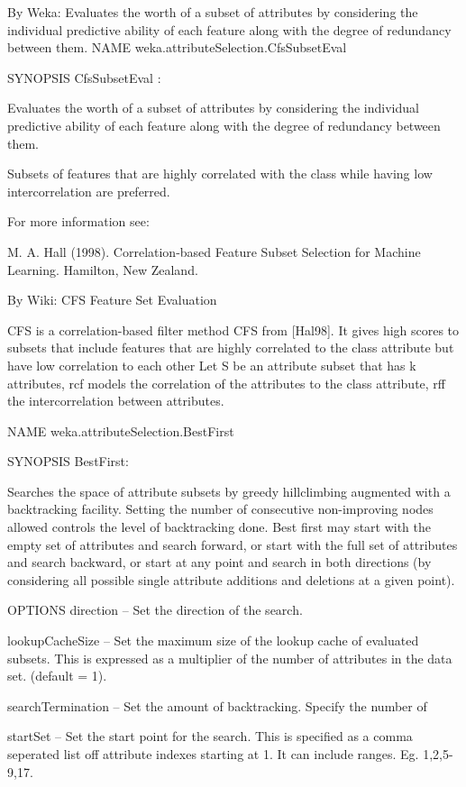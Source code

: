 By Weka:
Evaluates the worth of a subset of attributes by considering the individual predictive ability of each feature along with the degree of redundancy between them.
NAME
weka.attributeSelection.CfsSubsetEval

SYNOPSIS
CfsSubsetEval :

Evaluates the worth of a subset of attributes by considering the individual predictive ability of each feature along with the degree of redundancy between them.

Subsets of features that are highly correlated with the class while having low intercorrelation are preferred.

For more information see:

M. A. Hall (1998). Correlation-based Feature Subset Selection for Machine Learning. Hamilton, New Zealand.



By Wiki:
CFS Feature Set Evaluation

CFS is a correlation-based filter method CFS from [Hal98]. It gives high scores to subsets that include features
that are highly correlated to the class attribute but have low correlation to each other Let S be an attribute
subset that has k attributes, rcf models the correlation of the attributes to the class attribute, rff the
intercorrelation between attributes.


NAME
weka.attributeSelection.BestFirst

SYNOPSIS
BestFirst:

Searches the space of attribute subsets by greedy hillclimbing augmented with a backtracking facility. Setting the number of consecutive non-improving nodes allowed controls the level of backtracking done. Best first may start with the empty set of attributes and search forward, or start with the full set of attributes and search backward, or start at any point and search in both directions (by considering all possible single attribute additions and deletions at a given point).


OPTIONS
direction -- Set the direction of the search.

lookupCacheSize -- Set the maximum size of the lookup cache of evaluated subsets. This is expressed as a multiplier of the number of attributes in the data set. (default = 1).

searchTermination -- Set the amount of backtracking. Specify the number of 

startSet -- Set the start point for the search. This is specified as a comma seperated list off attribute indexes starting at 1. It can include ranges. Eg. 1,2,5-9,17.


